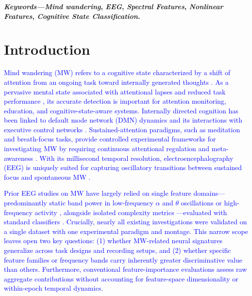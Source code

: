 \documentclass[conference]{IEEEtran}
\begin{document}
\textbf{\textit{Keywords---}\textit{Mind wandering}, \textit{EEG}, \textit{Spectral Features}, \textit{Nonlinear Features}, \textit{Cognitive State Classification}.}
 
\section{Introduction}

\textcolor{blue}{Mind wandering (MW) refers to a cognitive state characterized by a shift of attention from an ongoing task toward internally generated thoughts \cite{smallwood2013restless,killingsworth2010wandering}. As a pervasive mental state associated with attentional lapses and reduced task performance \cite{killingsworth2010wandering}, its accurate detection is important for attention monitoring, education, and cognitive-state-aware systems. Internally directed cognition has been linked to default mode network (DMN) dynamics \cite{raichle2001default} and its interactions with executive control networks \cite{christoff2016mind}. Sustained-attention paradigms, such as meditation and breath-focus tasks, provide controlled experimental frameworks for investigating MW by requiring continuous attentional regulation and meta-awareness \cite{lutz2008attention,tang2015neuroscience,cahn2013meditation}. With its millisecond temporal resolution, electroencephalography (EEG) is uniquely suited for capturing oscillatory transitions between sustained focus and spontaneous MW \cite{KAM2022119372,rodlarios}.}

\textcolor{blue}{Prior EEG studies on MW have largely relied on single feature domains---predominantly static band power in low-frequency $\alpha$ and $\theta$ oscillations \cite{KAM2022119372,rodlarios} or high-frequency activity \cite{berkovich2012mindfulness}, alongside isolated complexity metrics \cite{lu2022nonlinear}---evaluated with standard classifiers \cite{jin2020distinguishing,compton2019wandering,hosseini2019deep}. Crucially, nearly all existing investigations were validated on a single dataset with one experimental paradigm and montage. This narrow scope leaves open two key questions: (1) whether MW-related neural signatures generalize across task designs and recording setups, and (2) whether specific feature families or frequency bands carry inherently greater discriminative value than others. Furthermore, conventional feature-importance evaluations assess raw aggregate contributions without accounting for feature-space dimensionality or within-epoch temporal dynamics.}
\end{document}
